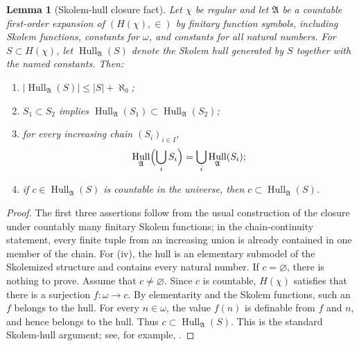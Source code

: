 \documentclass[11pt,letterpaper,reqno]{amsart}
\newtheorem{lem}[thm]{Lemma}
\theoremstyle{definition}
\numberwithin{equation}{section}
\DeclareMathOperator{\Hull}{Hull}
\begin{document}
\begin{lem}[Skolem-hull closure fact]\label{lem:skolem-hull}
Let \(\chi\) be regular and let \(\mathfrak A\) be a countable first-order
expansion of \((H(\chi),\in)\) by finitary function symbols, including
Skolem functions, constants for \(\omega\), and constants for all natural
numbers.  For \(S\subset H(\chi)\), let \(\Hull_{\mathfrak A}(S)\) denote the
Skolem hull generated by \(S\) together with the named constants.  Then:
\begin{enumerate}[label=(\roman*)]
\item \(|\Hull_{\mathfrak A}(S)|\le |S|+\aleph_0\);
\item \(S_1\subset S_2\) implies
      \(\Hull_{\mathfrak A}(S_1)\subset\Hull_{\mathfrak A}(S_2)\);
\item for every increasing chain \((S_i)_{i\in I}\),
      \[
      \Hull_{\mathfrak A}\Bigl(\bigcup_i S_i\Bigr)=
      \bigcup_i \Hull_{\mathfrak A}(S_i);
      \]
\item if \(c\in\Hull_{\mathfrak A}(S)\) is countable in the universe, then
      \(c\subset\Hull_{\mathfrak A}(S)\).
\end{enumerate}
\end{lem}

\begin{proof}
The first three assertions follow from the usual construction of the closure
under countably many finitary Skolem functions; in the chain-continuity
statement, every finite tuple from an increasing union is already contained in
one member of the chain. For (iv), the hull is an elementary submodel of the
Skolemized structure and contains every natural number.  If \(c=\varnothing\),
there is nothing to prove.  Assume that \(c\neq\varnothing\).  Since \(c\) is
countable, \(H(\chi)\) satisfies that there is a surjection
\(f:\omega\to c\).  By elementarity and the Skolem functions, such an \(f\)
belongs to the hull.  For every \(n\in\omega\), the value \(f(n)\) is definable
from \(f\) and \(n\), and hence belongs to the hull.  Thus
\(c\subset\Hull_{\mathfrak A}(S)\).  This is the standard Skolem-hull argument;
see, for example, \cite{Jech03,CK90}.
\end{proof}
\end{document}
